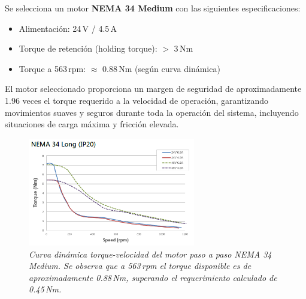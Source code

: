 Se selecciona un motor \textbf{NEMA 34 Medium} con las siguientes especificaciones:
\begin{itemize}
    \item Alimentación: 24\,V / 4.5\,A
    \item Torque de retención (holding torque): $>$ 3\,Nm
    \item Torque a 563\,rpm: $\approx$ 0.88\,Nm (según curva dinámica)
\end{itemize}

El motor seleccionado proporciona un margen de seguridad de aproximadamente 1.96 veces el torque requerido a la velocidad de operación, garantizando movimientos suaves y seguros durante toda la operación del sistema, incluyendo situaciones de carga máxima y fricción elevada.

\begin{figure}[H]
    \centering
    \includegraphics[width=0.65\textwidth]{img/Nema34.png}
    \caption{\textit{Curva dinámica torque-velocidad del motor paso a paso NEMA 34 Medium. Se observa que a 563\,rpm el torque disponible es de aproximadamente 0.88\,Nm, superando el requerimiento calculado de 0.45\,Nm.}}
    \label{fig:Curva_din_nema34}
\end{figure}